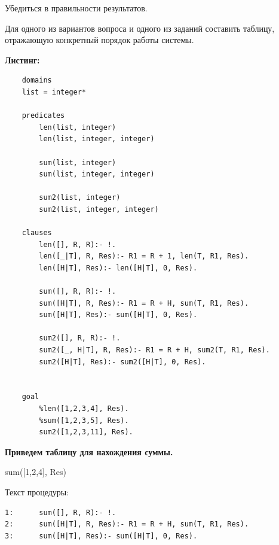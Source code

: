 \documentclass[12pt, a4paper]{extarticle}
\begin{document}
Убедиться в правильности результатов. 

Для одного из вариантов вопроса и одного из заданий составить таблицу, отражающую конкретный порядок работы системы. 


\hfill

\textbf{Листинг:}

\begin{lstlisting}
	domains
	list = integer*
	
	predicates
		len(list, integer)
		len(list, integer, integer)
		
		sum(list, integer)
		sum(list, integer, integer)
		
		sum2(list, integer)
		sum2(list, integer, integer)
	
	clauses
		len([], R, R):- !.
		len([_|T], R, Res):- R1 = R + 1, len(T, R1, Res).
		len([H|T], Res):- len([H|T], 0, Res).
		
		sum([], R, R):- !.
		sum([H|T], R, Res):- R1 = R + H, sum(T, R1, Res).
		sum([H|T], Res):- sum([H|T], 0, Res).
		
		sum2([], R, R):- !.
		sum2([_, H|T], R, Res):- R1 = R + H, sum2(T, R1, Res).
		sum2([H|T], Res):- sum2([H|T], 0, Res).
		
	
	goal
		%len([1,2,3,4], Res).
		%sum([1,2,3,5], Res).
		sum2([1,2,3,11], Res).
\end{lstlisting}

\newpage
\textbf{Приведем таблицу для нахождения суммы. }\par
sum([1,2,4], Res)\par
Текст процедуры:
\begin{lstlisting}
1:		sum([], R, R):- !.
2:		sum([H|T], R, Res):- R1 = R + H, sum(T, R1, Res).
3:		sum([H|T], Res):- sum([H|T], 0, Res).
\end{lstlisting}\par
\end{document}
